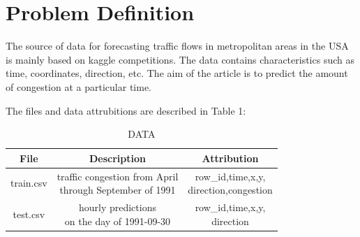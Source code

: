 \section{Problem Definition}\label{sec-intro}
The source of data for forecasting traffic flows in metropolitan areas in the USA is mainly based on kaggle competitions. The data contains characteristics such as time, coordinates, direction, etc. The aim of the article is to predict the amount of congestion at a particular time.\par 
The files and data attrubitions are described in Table 1:
\begin{center}
	\begin{table}[htbp]
		\setlength{\abovecaptionskip}{2pt}
		\centering
		\caption{DATA}
		\begin{tabular}{ c | c | c }
			\toprule
			File    &Description      & Attribution       \\
			\midrule
			train.csv       &  \makecell{traffic congestion from April\\through September of 1991}   &  \makecell{row_id,time,x,y,\\direction,congestion}       \\
			\midrule
			test.csv       & \makecell{hourly predictions \\on the day of 1991-09-30}   &\makecell{row_id,time,x,y,\\direction}     \\
			\bottomrule
		\end{tabular}
	\end{table}
\end{center}





